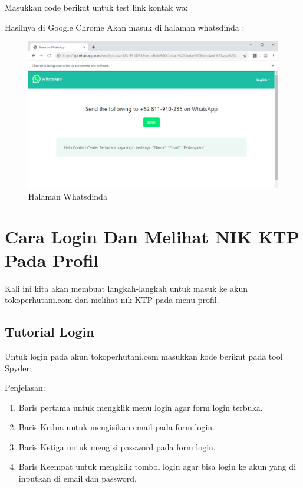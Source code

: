 Masukkan code berikut untuk test link kontak wa:



Hasilnya  di Google Chrome Akan masuk di halaman whatsdinda : 

\begin{figure}[h]
	\centering
	\includegraphics[scale=0.30]{figures/5linkwa}
	\caption{Halaman Whatsdinda}
\end{figure}

\newpage
\section{Cara Login Dan Melihat NIK KTP Pada Profil}
Kali ini kita akan membuat langkah-langkah untuk masuk ke akun tokoperhutani.com dan melihat nik KTP pada menu profil.  
\subsection{Tutorial Login}
Untuk login pada akun tokoperhutani.com masukkan kode berikut pada tool Spyder:


Penjelasan:
\begin{enumerate}
	\item Baris pertama untuk mengklik menu login agar form login terbuka.
	\item Baris Kedua untuk mengisikan email pada form login. 
	\item Baris Ketiga untuk mengisi password pada form login.
	\item Baris Keempat untuk mengklik tombol login agar bisa login ke akun yang di inputkan di email dan password.
\end{enumerate}

